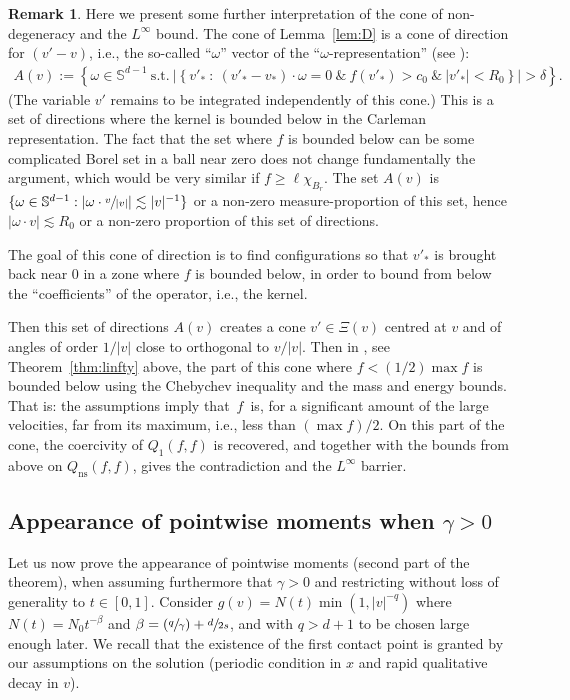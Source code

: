 \documentclass[11pt]{article}
\newcommand{\ie}{i.e.,\xspace}
\newcommand{\Psfrac}[2]{(\sfrac{#1}{#2})}
\newcommand{\ns}{\mathrm{ns}}
\theoremstyle{plain}
\theoremstyle{definition}
\newtheorem{remark}[thm]{Remark}
\numberwithin{equation}{section}
\let\A N
\newcommand{\Ao}{N_0}
\begin{document}
\begin{remark} Here we present some further interpretation of the cone
of non-degeneracy and the $L^\infty$ bound. The cone of
Lemma~\ref{lem:D} is a cone of direction for $(v'-v)$, \ie the
so-called ``$\omega$'' vector of the ``$\omega$-representation''
(see \cite[\S 4.6]{villani-book}):
\begin{align*}
A(v) :=
\left\{ \omega \in \mathbb S^{d-1} \
\mbox{s.t.} \ \left| \left\{ v'_* \ : \ (v'_*-v_*)
\cdot \omega =0 \ \& \ f(v'_*) > c_0 \ \& \ |v'_*| < R_0 \right\}
\right| > \delta \right\}.
\end{align*}
(The variable $v'$ remains to be integrated independently of this
cone.) This is a set of directions where the kernel is bounded below
in the Carleman representation. The fact that the set where $f$ is
bounded below can be some complicated Borel set in a ball near zero
does not change fundamentally the argument, which would be very
similar if $f \ge \ell \chi_{B_r}$. The set $A(v)$ is
$\{ \omega \in \mathbb S^{d-1}: |\omega \cdot \sfrac{v}{|v|}| \lesssim |v|^{-1}\}$ or a non-zero
measure-proportion of this set, hence $|\omega \cdot v| \lesssim R_0$
or a non-zero proportion of this set of directions.

The goal of this cone of direction is to find configurations so
that $v'_*$ is brought back near $0$ in a zone where $f$ is bounded
below, in order to bound from below the ``coefficients'' of the
operator, \ie the kernel.

Then this set of directions $A(v)$ creates a cone $v' \in \Xi(v)$
centred at $v$ and of angles of order $1/|v|$ close to orthogonal to
$v/|v|$. Then in \cite{luis}, see Theorem~\ref{thm:linfty} above,
the part of this cone where $f < (1/2) \max f$ is bounded below using
the Chebychev inequality and the mass and energy bounds. That is: the
assumptions imply that~$f$~is, for a significant amount of the large
velocities, far from its maximum, \ie less than $(\max f)/2$. On this
part of the cone, the coercivity of $Q_1(f,f)$ is recovered, and together
with the bounds from above on $Q_{\ns}(f,f)$, gives the contradiction and the
$L^\infty$ barrier.
\end{remark}

\subsection{Appearance of pointwise moments when $\gamma>0$}
\label{s:appearance-hard}

Let us now prove the appearance of pointwise moments (second part of
the theorem), when assuming furthermore that $\gamma >0$ and
restricting without loss of generality to $t \in [0,1]$. Consider
$g(v) = \A(t) \min\left(1,|v|^{-q} \right)$ where
$\A(t) = \Ao t^{-\beta}$ and $\beta = \Psfrac q \gamma + \sfrac{d}{2s}$,
and with $q >d+1$ to be chosen large enough later. We recall that the
existence of the first contact point is granted by our assumptions on
the solution (periodic condition in $x$ and rapid qualitative decay in
$v$).
\end{document}
